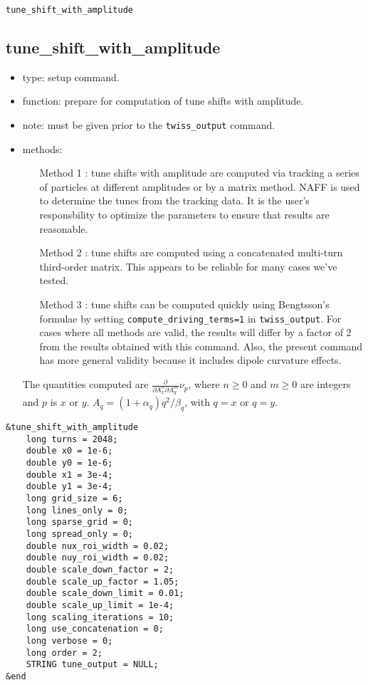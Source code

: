 \documentclass[11pt]{article}
\begin{document}
\begin{latexonly}
\newpage
\begin{center}{\Large\verb|tune_shift_with_amplitude|}\end{center}
\end{latexonly}
\subsection{tune\_shift\_with\_amplitude \label{subsec:tuneshiftwithamplitude}}

\begin{itemize}
\item type: setup command.
\item function: prepare for computation of tune shifts with amplitude.
\item note: must be given prior to the \verb|twiss_output| command.
\item methods: 
\begin{itemize}
 \item[Method 1]: tune shifts with amplitude are computed via tracking a series of
  particles at different amplitudes or by a matrix method.  NAFF is used to 
  determine the tunes from the tracking data.  It is the user's responsbility to optimize the
  parameters to ensure that results are reasonable.  
 \item[Method 2]: tune shifts are computed using a concatenated multi-turn third-order matrix.
 This appears to be reliable for many cases we've tested.
 \item[Method 3]: tune shifts can be computed quickly using Bengtsson's formulae \cite{Bengtsson} by
 setting \verb|compute_driving_terms=1| in \verb|twiss_output|.  For cases where all methods are
 valid, the results will differ by a factor of 2 from the results obtained with this command.
 Also, the present command has more general validity because it includes dipole curvature effects.
\end{itemize}

The quantities computed are $\frac{\partial}{\partial A_x^n \partial A_y^m}\nu_p$, where $n\geq 0$ and $m \geq 0$ are
integers and $p$ is $x$ or $y$.  $A_q = (1 + \alpha_q) q^2/\beta_q$, with $q=x$ or $q=y$.

\end{itemize}

\begin{verbatim}
&tune_shift_with_amplitude
    long turns = 2048;
    double x0 = 1e-6;
    double y0 = 1e-6;
    double x1 = 3e-4;
    double y1 = 3e-4;
    long grid_size = 6;
    long lines_only = 0;
    long sparse_grid = 0;
    long spread_only = 0;
    double nux_roi_width = 0.02;
    double nuy_roi_width = 0.02;
    double scale_down_factor = 2;
    double scale_up_factor = 1.05;
    double scale_down_limit = 0.01;
    double scale_up_limit = 1e-4;
    long scaling_iterations = 10;
    long use_concatenation = 0;
    long verbose = 0;
    long order = 2;
    STRING tune_output = NULL;
&end
\end{verbatim}
\end{document}
